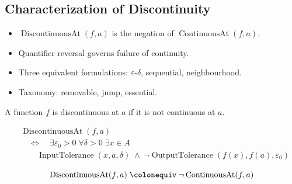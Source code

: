 
\subsection{Characterization of Discontinuity}
\label{sec:discontinuity}

\begin{tcolorbox}[title={Toolkit --- Discontinuity}]
\begin{itemize}
  \item $\operatorname{DiscontinuousAt}(f,a)$ is the negation of $\operatorname{ContinuousAt}(f,a)$.
  \item Quantifier reversal governs failure of continuity.
  \item Three equivalent formulations: $\varepsilon$-$\delta$, sequential, neighbourhood.
  \item Taxonomy: removable, jump, essential.
\end{itemize}
\end{tcolorbox}


\begin{tcolorbox}[title={Definition --- Point of Discontinuity}]
\begin{definition}
\label{def:point-of-discontinuity}
A function $f$ is discontinuous at $a$ if it is not continuous at $a$.
\end{definition}
\end{tcolorbox}

\begin{remark*}
\[
\begin{aligned}
&\operatorname{DiscontinuousAt}(f,a) \\
&\quad\Longleftrightarrow\quad
\exists \varepsilon_0 > 0 \; \forall \delta > 0 \; \exists x \in A \\
&\qquad \operatorname{InputTolerance}(x,a,\delta)
\;\wedge\;
\neg \operatorname{OutputTolerance}(f(x),f(a),\varepsilon_0)
\end{aligned}
\]
\end{remark*}

\begin{remark*}
\[
\operatorname{DiscontinuousAt}(f,a)
\;\colonequiv\;
\neg \operatorname{ContinuousAt}(f,a)
\]
\end{remark*}

